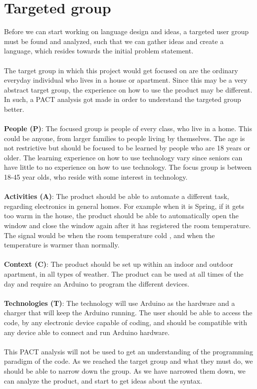 \section{Targeted group}
\label{targetedGroup}
Before we can start working on language design and ideas, a targeted user group must be found and analyzed, such that we can gather ideas and create a language, which resides towards the initial problem statement.  \\ 
\\ 
The target group in which this project would get focused on are the ordinary everyday individual who lives in a house or apartment. Since this may be a very abstract target group, the experience on how to use the product may be different. In such, a PACT analysis got made in order to understand the targeted group better. \\ 
\\ 
\textbf{People (P)}: The focused group is people of every class, who live in a home. This could be anyone, from larger families to people living by themselves. The age is not restrictive but should be focused to be learned by people who are 18 years or older. The learning experience on how to use technology vary since seniors can have little to no experience on how to use technology. The focus group is between 18-45 year olds, who reside with some interest in technology.\\ 
\\ 
\textbf{Activities (A)}: The product should be able to automate a different task, regarding electronics in general homes. For example when it is Spring, if it gets too warm in the house, the product should be able to automatically open the window and close the window again after it has registered the room temperature. The signal would be when the room temperature cold , and when the temperature is warmer than normally.  \\ 
\\ 
\textbf{Context (C)}: The product should be set up within an indoor and outdoor apartment, in all types of weather. The product can be used at all times of the day and require an Arduino to program the different devices.\\ 
\\ 
\textbf{Technologies (T)}: The technology will use Arduino as the hardware and a charger that will keep the Arduino running. The user should be able to access the code, by any electronic device capable of coding, and should be compatible with any device able to connect and run Arduino hardware. \\ 
\\ 
This PACT analysis will not be used to get an understanding of the programming paradigm of the code. As we reached the target group and what they must do, we should be able to narrow down the group. As we have narrowed them down, we can analyze the product, and start to get ideas about the syntax.